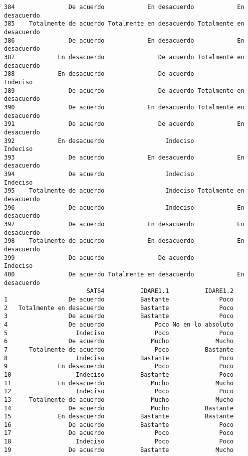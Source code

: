 \documentclass[
  letterpaper,
  DIV=11,
  numbers=noendperiod]{scrartcl}
\begin{document}
\begin{verbatim}
384               De acuerdo            En desacuerdo            En desacuerdo
385    Totalmente de acuerdo Totalmente en desacuerdo Totalmente en desacuerdo
386               De acuerdo            En desacuerdo            En desacuerdo
387            En desacuerdo               De acuerdo Totalmente en desacuerdo
388            En desacuerdo               De acuerdo                 Indeciso
389               De acuerdo               De acuerdo Totalmente en desacuerdo
390               De acuerdo            En desacuerdo Totalmente en desacuerdo
391               De acuerdo               De acuerdo            En desacuerdo
392            En desacuerdo                 Indeciso                 Indeciso
393               De acuerdo            En desacuerdo            En desacuerdo
394               De acuerdo                 Indeciso                 Indeciso
395    Totalmente de acuerdo                 Indeciso Totalmente en desacuerdo
396               De acuerdo                 Indeciso            En desacuerdo
397               De acuerdo            En desacuerdo            En desacuerdo
398    Totalmente de acuerdo            En desacuerdo            En desacuerdo
399               De acuerdo               De acuerdo                 Indeciso
400               De acuerdo Totalmente en desacuerdo            En desacuerdo
                       SATS4          IDARE1.1          IDARE1.2
1                 De acuerdo          Bastante              Poco
2   Totalmente en desacuerdo          Bastante              Poco
3                 De acuerdo          Bastante              Poco
4                 De acuerdo              Poco No en lo absoluto
5                   Indeciso              Poco              Poco
6                 De acuerdo             Mucho             Mucho
7      Totalmente de acuerdo              Poco          Bastante
8                   Indeciso          Bastante              Poco
9              En desacuerdo              Poco              Poco
10                  Indeciso          Bastante              Poco
11             En desacuerdo             Mucho             Mucho
12                  Indeciso              Poco              Poco
13     Totalmente de acuerdo             Mucho             Mucho
14                De acuerdo             Mucho          Bastante
15             En desacuerdo          Bastante          Bastante
16                De acuerdo          Bastante              Poco
17                De acuerdo              Poco              Poco
18                  Indeciso              Poco              Poco
19                De acuerdo          Bastante             Mucho

\end{verbatim}
\end{document}
